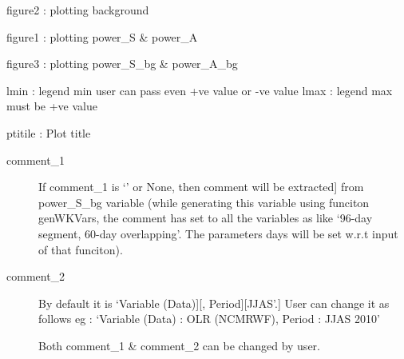 \documentclass[letterpaper,10pt,english]{sphinxmanual}
\begin{document}

\begin{fulllineitems}
\label{mjo:wk_utils.plotWKBackground}
figure2 : plotting background

\end{fulllineitems}


\begin{fulllineitems}
\label{mjo:wk_utils.plotWKPowers}
figure1 : plotting power\_S \& power\_A

\end{fulllineitems}


\begin{fulllineitems}
\label{mjo:wk_utils.plotWK_Sym_ASym}
figure3 : plotting power\_S\_bg \& power\_A\_bg

lmin : legend min user can pass even +ve value or -ve value
lmax : legend max must be +ve value

ptitile : Plot title
\begin{description}
\item[{comment\_1}] \leavevmode{[}If comment\_1 is `' or None, then comment will be extracted{]}
from power\_S\_bg variable (while generating this variable
using funciton genWKVars, the comment has set to all the
variables as like `96-day segment, 60-day overlapping'.
The parameters days will be set w.r.t input of that funciton).

\item[{comment\_2}] \leavevmode{[}By default it is `Variable (Data){]}{[}, Period{]}{[}JJAS'.{]}
User can change it as follows
eg : `Variable (Data) : OLR (NCMRWF), Period : JJAS 2010'

Both comment\_1 \& comment\_2 can be changed by user.

\end{description}

\end{fulllineitems}
\end{document}
